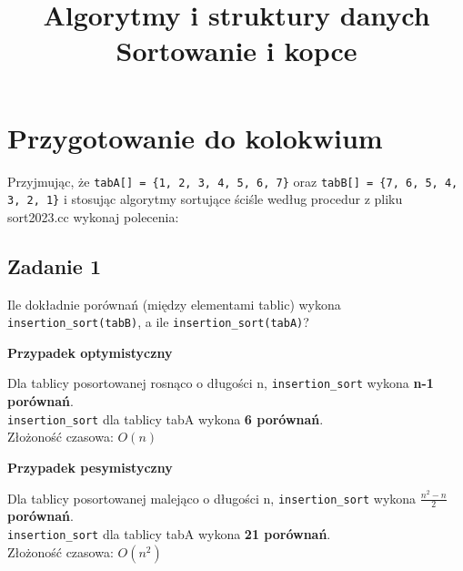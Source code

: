 \documentclass{article}
\title{
    \Huge\textbf{Algorytmy i struktury danych} \\
    \vspace{2mm}
    \huge{Sortowanie i kopce} 
    \date{}
}
\begin{document}
    \maketitle
    \boldmath
    \section*{Przygotowanie do kolokwium}
    Przyjmując, że \verb+tabA[] = {1, 2, 3, 4, 5, 6, 7}+ oraz \verb+tabB[] = {7, 6, 5, 4, 3, 2, 1}+ i stosując algorytmy
    sortujące ściśle według procedur z pliku sort2023.cc wykonaj polecenia:

    \subsection*{Zadanie 1}
    Ile dokładnie porównań (między elementami tablic) wykona \verb+insertion_sort(tabB)+, a ile \verb+insertion_sort(tabA)+?

    \begin{center}
        \textbf{Przypadek optymistyczny}
        \begin{center}
            Dla tablicy posortowanej rosnąco o długości n, \verb+insertion_sort+ wykona \textbf{n-1 porównań}. \\
            \verb+insertion_sort+ dla tablicy tabA wykona \textbf{6 porównań}. \\ 
            Złożoność czasowa: $O(n)$
        \end{center}

        \textbf{Przypadek pesymistyczny}
        \begin{center}
            Dla tablicy posortowanej malejąco o długości n, \verb+insertion_sort+ wykona $\frac{n^2 - n}{2}$ \textbf{porównań}. \\ 
            \verb+insertion_sort+ dla tablicy tabA wykona \textbf{21 porównań}. \\
            Złożoność czasowa: $O(n^2)$
        \end{center}
    \end{center}
\end{document}
